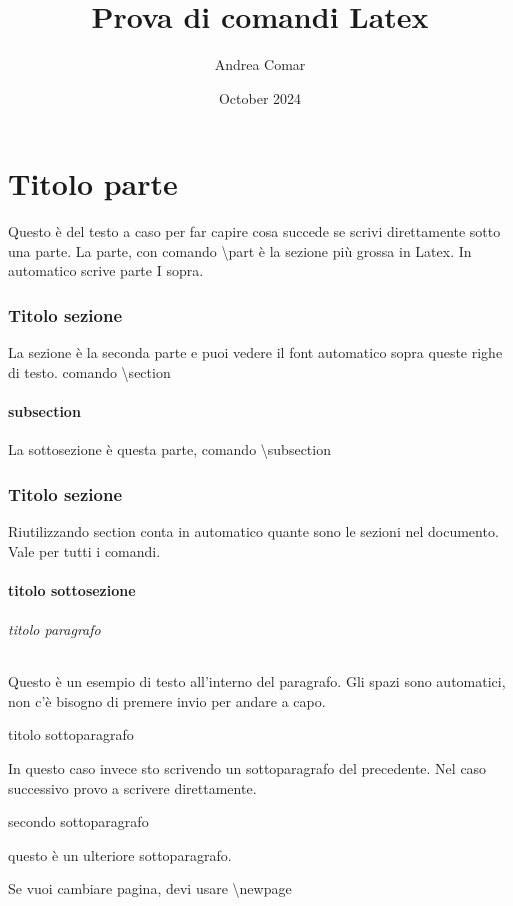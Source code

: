 \documentclass{article} %
\title{Prova di comandi Latex}
\author{Andrea Comar}
\date{October 2024}
\begin{document}
\maketitle %

\tableofcontents %

\newpage

\part{ Titolo parte }
Questo è del testo a caso per far capire cosa succede se scrivi direttamente sotto una parte.
La parte, con comando \textbackslash part è la sezione più grossa in Latex. In automatico scrive parte I sopra. 

\section{ Titolo sezione }
La sezione è la seconda parte e puoi vedere il font automatico sopra queste righe di testo.
comando \textbackslash section
\subsection{ subsection }
La sottosezione è questa parte, comando \textbackslash subsection
\section{ Titolo sezione }
Riutilizzando section conta in automatico quante sono le sezioni nel documento. Vale per tutti i comandi.
\subsection{ titolo sottosezione}



\paragraph{titolo paragrafo}
Questo è un esempio di testo all'interno del paragrafo. 
Gli spazi sono automatici, non c'è bisogno di premere invio per andare a capo.
\subparagraph{titolo sottoparagrafo }  In questo caso invece sto scrivendo un sottoparagrafo del precedente. 
Nel caso successivo provo a scrivere direttamente.
\subparagraph{secondo sottoparagrafo} questo è un ulteriore sottoparagrafo.

Se vuoi cambiare pagina, devi usare \textbackslash newpage
\newpage
\end{document}
